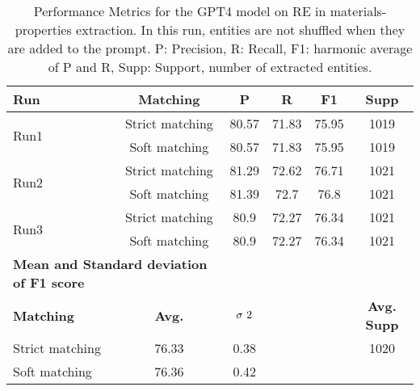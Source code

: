 \begin{table}[htbp]
    \small
    \centering
    \caption{Performance Metrics for the GPT4 model on RE in materials-properties extraction. In this run, entities are not shuffled when they are added to the prompt. P: Precision, R: Recall, F1: harmonic average of P and R, Supp: Support, number of extracted entities.}
    \begin{tabular}{lccccc}
        \toprule
        \textbf{Run} & \textbf{Matching} & \textbf{P} & \textbf{R} & \textbf{F1} & \textbf{Supp} \\
        \midrule
        \multirow{2}{*}{Run1} & Strict matching & 80.57 & 71.83 & 75.95 & 1019 \\
        & Soft matching & 80.57 & 71.83 & 75.95 & 1019 \\
        \midrule
        \multirow{2}{*}{Run2} & Strict matching & 81.29 & 72.62 & 76.71 & 1021 \\
        & Soft matching & 81.39 & 72.7  & 76.8 & 1021 \\
        \midrule
        \multirow{2}{*}{Run3} & Strict matching & 80.9 & 72.27 & 76.34 & 1021 \\
        & Soft matching & 80.9 & 72.27 & 76.34 & 1021 \\
        \midrule
        \multicolumn{2}{l}{\textbf{Mean and Standard deviation of F1 score}} & & & & \\
        \midrule
        \textbf{Matching} & \textbf{Avg.} & $\sigma\textsuperscript{2}$ & & & \textbf{Avg. Supp}\\
        Strict matching & 76.33 & 0.38 & & & 1020 \\
        Soft matching & 76.36 & 0.42 & & \\
        \bottomrule
    \end{tabular}
\end{table}


